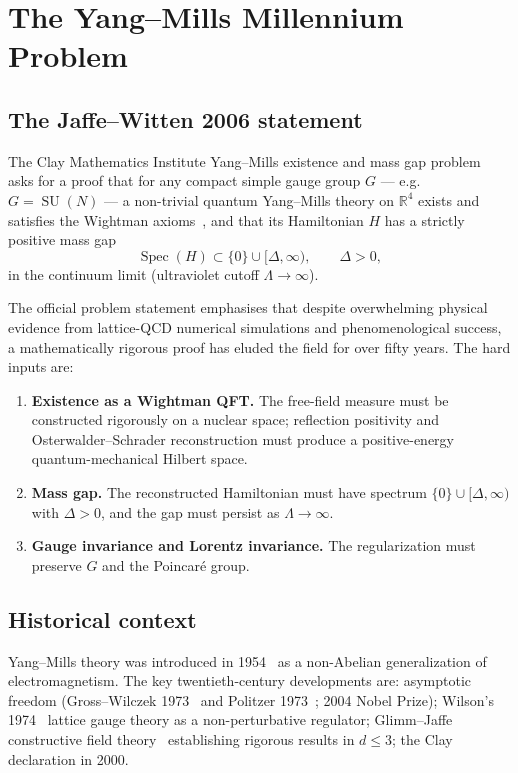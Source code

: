 \documentclass[11pt,a4paper]{article}
\theoremstyle{plain}
\theoremstyle{definition}
\DeclareMathOperator{\SU}{SU}
\DeclareMathOperator{\Spec}{Spec}
\newcommand{\R}{\mathbb{R}}
\begin{document}
\tableofcontents

\section{The Yang--Mills Millennium Problem}
\label{sec:problem}

\subsection{The Jaffe--Witten 2006 statement}

The Clay Mathematics Institute Yang--Mills existence and mass gap
problem~\cite{jaffe2006quantum} asks for a proof that for any compact
simple gauge group $G$ --- e.g.\ $G = \SU(N)$ --- a non-trivial
quantum Yang--Mills theory on $\R^{4}$ exists and satisfies the
Wightman axioms~\cite{wightman1956quantum}, and that its Hamiltonian
$H$ has a strictly positive mass gap
\[
\Spec(H) \subset \{0\} \cup [\Delta, \infty), \qquad \Delta > 0,
\]
in the continuum limit (ultraviolet cutoff $\Lambda \to \infty$).

The official problem statement emphasises that despite overwhelming
physical evidence from lattice-QCD numerical simulations and
phenomenological success, a mathematically rigorous proof has eluded
the field for over fifty years. The hard inputs are:

\begin{enumerate}[label=\textbf{J\arabic*.},leftmargin=*]
\item \textbf{Existence as a Wightman QFT.} The free-field measure
must be constructed rigorously on a nuclear space; reflection
positivity and Osterwalder--Schrader reconstruction must produce a
positive-energy quantum-mechanical Hilbert space.
\item \textbf{Mass gap.} The reconstructed Hamiltonian must have
spectrum $\{0\} \cup [\Delta, \infty)$ with $\Delta > 0$, and the gap
must persist as $\Lambda \to \infty$.
\item \textbf{Gauge invariance and Lorentz invariance.} The
regularization must preserve $G$ and the Poincar\'e group.
\end{enumerate}

\subsection{Historical context}

Yang--Mills theory was introduced in 1954~\cite{yang1954conservation}
as a non-Abelian generalization of electromagnetism. The key
twentieth-century developments are: asymptotic freedom (Gross--Wilczek
1973~\cite{gross1973ultraviolet} and Politzer
1973~\cite{politzer1973reliable}; 2004 Nobel Prize); Wilson's
1974~\cite{wilson1974confinement} lattice gauge theory as a
non-perturbative regulator; Glimm--Jaffe constructive field
theory~\cite{glimm1987quantum} establishing rigorous results in $d \le
3$; the Clay declaration in 2000.
\end{document}
